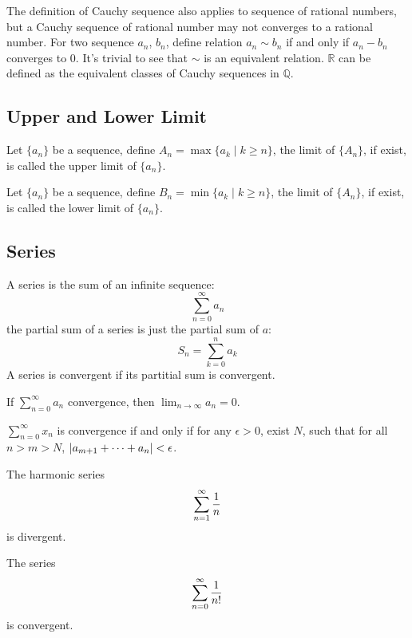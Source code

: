The definition of Cauchy sequence also applies to sequence of rational numbers,
but a Cauchy sequence of rational number may not converges to a rational number.
For two sequence $a_n$, $b_n$, define relation $a_n \sim b_n$ if and only if
$a_n - b_n$ converges to $0$.
It's trivial to see that $\sim$ is an equivalent relation.
$\mathbb R$ can be defined as the equivalent classes of Cauchy sequences in $\mathbb Q$.

\subsection{Upper and Lower Limit}

\begin{defi}
Let $\{a_n\}$ be a sequence, define $A_n = \max\{a_k \mid k \geq n\}$,
the limit of $\{A_n\}$, if exist, is called the upper limit of $\{a_n\}$.
\end{defi}

\begin{defi}
Let $\{a_n\}$ be a sequence, define $B_n = \min\{a_k \mid k \geq n\}$,
the limit of $\{A_n\}$, if exist, is called the lower limit of $\{a_n\}$.
\end{defi}


\subsection{Series}
A series is the sum of an infinite sequence: $$\sum_{n=0}^\infty a_n$$
the partial sum of a series is just the partial sum of $a$:
$$S_n = \sum_{k=0}^n a_k$$
A series is convergent if its partitial sum is convergent.
\begin{pro}
If $\sum_{n=0}^\infty a_n$ convergence, then $\lim_{n \to \infty} a_n = 0$.
\end{pro}

\begin{pro}
$\sum_{n=0}^\infty x_n$ is convergence if and only if for any $\epsilon > 0$,
exist $N$, such that for all $n > m > N$, $\left| {a_{m+1} + \cdots + a_n} \right| < \epsilon$.
\end{pro}

\begin{pro}
The harmonic series $$\sum_{n=1}^\infty {1 \over n}$$ is divergent.
\end{pro}

\begin{pro}
The series $$\sum_{n=0}^\infty {1 \over n!}$$ is convergent.
\end{pro}
